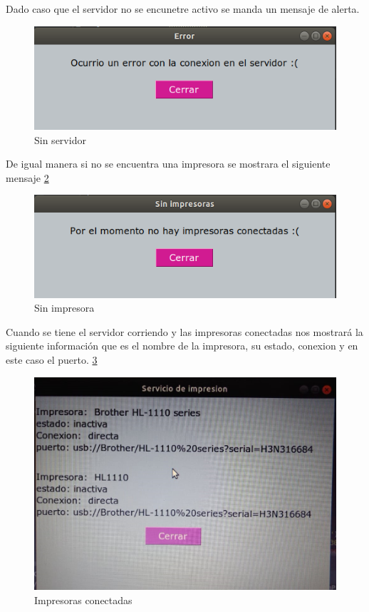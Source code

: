 Dado caso que el servidor no se encunetre activo se manda un mensaje de alerta.
\FloatBarrier
\begin{figure}[htbp!]
		\centering
			\includegraphics[width=.9\textwidth]{images/s8}
		\caption{Sin servidor}
		\label{image:s8}
\end{figure}
\FloatBarrier

De igual manera si no se encuentra una impresora se mostrara el siguiente mensaje \ref{image:s9}
\FloatBarrier
\begin{figure}[htbp!]
		\centering
			\includegraphics[width=.9\textwidth]{images/s9}
		\caption{Sin impresora}
		\label{image:s9}
\end{figure}
\FloatBarrier

Cuando se tiene el servidor corriendo y las impresoras conectadas nos mostrará la siguiente información que es el nombre de la impresora, su estado, conexion y en este caso el puerto. \ref{image:final} 

\FloatBarrier
\begin{figure}[htbp!]
		\centering
			\includegraphics[width=.9\textwidth]{images/final}
		\caption{Impresoras conectadas}
		\label{image:final}
\end{figure}
\FloatBarrier